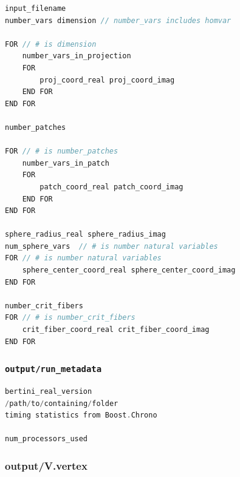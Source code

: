 \begin{center}\begin{minipage}{0.9\linewidth}
\begin{lstlisting}[language=c++, caption={\tt output/decomp}, captionpos=b]
input_filename
number_vars dimension // number_vars includes homvar

FOR // # is dimension
	number_vars_in_projection
	FOR
		proj_coord_real proj_coord_imag 
	END FOR
END FOR

number_patches

FOR // # is number_patches
	number_vars_in_patch
	FOR
		patch_coord_real patch_coord_imag 
	END FOR
END FOR

sphere_radius_real sphere_radius_imag
num_sphere_vars  // # is number natural variables
FOR // # is number natural variables
	sphere_center_coord_real sphere_center_coord_imag
END FOR

number_crit_fibers
FOR // # is number_crit_fibers
	crit_fiber_coord_real crit_fiber_coord_imag
END FOR
\end{lstlisting}
\end{minipage}\end{center}


\subsubsection{\tt output/run\_metadata}
\label{sec:run_metadata}

\begin{center}\begin{minipage}{0.9\linewidth}
\begin{lstlisting}[language=c++, caption={\tt output/decomp}, captionpos=b]
bertini_real_version
/path/to/containing/folder
timing statistics from Boost.Chrono

num_processors_used
\end{lstlisting}
\end{minipage}\end{center}






\subsubsection{output/V.vertex}
\label{sec:v.vertex}



